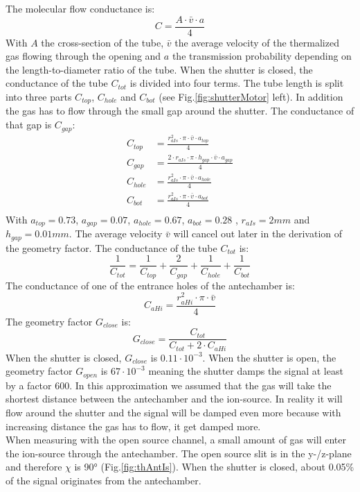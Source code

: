 		The molecular flow conductance is:
		\begin{equation}
			C = \frac{A\cdot\bar{v}\cdot a}{4}
		\end{equation}
		With $A$ the cross-section of the tube, $\bar{v}$ the average velocity of the thermalized gas flowing through the opening and $a$ the transmission probability depending on the length-to-diameter ratio of the tube. When the shutter is closed, the conductance of the tube $C_{tot}$ is divided into four terms. The tube length is split into three parts $C_{top}$, $C_{hole}$ and $C_{bot}$ (see Fig.\ref{fig:shutterMotor} left). In addition the gas has to flow through the small gap around the shutter. The conductance of that gap is $C_{gap}$:
		\begin{align}
			C_{top}  &= \frac{r_{aIs}^2\cdot\pi\cdot\bar{v}\cdot a_{top}}{4}\\
			C_{gap}  &= \frac{2\cdot r_{aIs}\cdot \pi \cdot h_{gap}\cdot\bar{v}\cdot a_{gap}}{4}\\
			C_{hole} &= \frac{r_{aIs}^2\cdot\pi\cdot\bar{v}\cdot a_{hole}}{4}\\
			C_{bot}  &= \frac{r_{aIs}^2\cdot\pi\cdot\bar{v}\cdot a_{bot}}{4}\\
		\end{align}
		With $a_{top} = 0.73$, $a_{gap} = 0.07$, $a_{hole} = 0.67$, $a_{bot} = 0.28$ \cite{molFlowTubeTransm_Essen1976}, $r_{aIs} = 2 mm$ and $h_{gap} = 0.01 mm$. The average velocity $\bar{v}$ will cancel out later in the derivation of the geometry factor. The conductance of the tube $C_{tot}$ is:
		\begin{equation}
			\frac{1}{C_{tot}} = \frac{1}{C_{top}} + \frac{2}{C_{gap}} + \frac{1}{C_{hole}} + \frac{1}{C_{bot}}
		\end{equation}
		The conductance of one of the entrance holes of the antechamber is:
		\begin{equation}
			C_{aHi} = \frac{r_{aHi}^2\cdot\pi\cdot\bar{v}}{4}
		\end{equation}
		The geometry factor $G_{close}$ is:
		\begin{equation}
			G_{close} = \frac{C_{tot}}{C_{tot} + 2\cdot C_{aHi}}
		\end{equation}
		When the shutter is closed, $G_{close}$ is $0.11\cdot10^{-3}$. When the shutter is open, the geometry factor $G_{open}$ is $67\cdot10^{-3}$ meaning the shutter damps the signal at least by a factor 600. In this approximation we assumed that the gas will take the shortest distance between the antechamber and the ion-source. In reality it will flow around the shutter and the signal will be damped even more because with increasing distance the gas has to flow, it get damped more.\\
		When measuring with the open source channel, a small amount of gas will enter the ion-source through the antechamber. The open source slit is in the y-/z-plane and therefore $\chi$ is 90\si{\degree} (Fig.\ref{fig:thAntIs}). When the shutter is closed, about 0.05\% of the signal originates from the antechamber.
		
